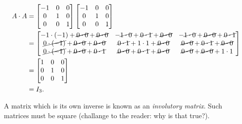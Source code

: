 \begin{align*}
	A\cdot A &=
	\begin{bmatrix}
		-1 & 0 & 0\\
		 0 & 1 & 0\\
		 0 & 0 & 1\\
	\end{bmatrix}
	\begin{bmatrix}
		-1 & 0 & 0\\
		 0 & 1 & 0\\
		 0 & 0 & 1\\
	\end{bmatrix}\\
			 &=
	\begin{bmatrix}
		-1\cdot(-1) + \cancel{\cancel{0\cdot0}}+\cancel{\cancel{0\cdot0}} & -\cancel{1\cdot0}+\cancel{0\cdot1}+\cancel{\cancel{0\cdot0}} & -\cancel{1\cdot0}+\cancel{\cancel{0\cdot0}}+\cancel{0\cdot1}\\
		 \cancel{0\cdot(-1)} + \cancel{\cancel{0\cdot0}}+\cancel{\cancel{0\cdot0}} &  \cancel{0\cdot1}+1\cdot1+\cancel{\cancel{0\cdot0}} &  \cancel{\cancel{0\cdot0}}+\cancel{0\cdot1}+\cancel{\cancel{0\cdot0}}\\
		 \cancel{0\cdot(-1)} + \cancel{\cancel{0\cdot0}}+\cancel{0\cdot1} &  \cancel{\cancel{0\cdot0}}+\cancel{0\cdot1}+\cancel{\cancel{0\cdot0}} &  \cancel{\cancel{0\cdot0}}+\cancel{\cancel{0\cdot0}}+1\cdot1\\
	\end{bmatrix}\\
			 &=
	\begin{bmatrix}
		1 & 0 & 0\\
		0 & 1 & 0\\
		0 & 0 & 1\\
	\end{bmatrix}\\
			 &= I_{3}.
\end{align*}

A matrix which is its own inverse is known as an \emph{involutory matrix}. Such matrices must be square (challange to the reader: why is that true?).

